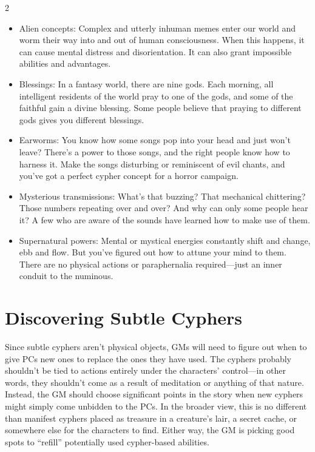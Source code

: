 \begin{multicols}{2}
\begin{itemize}
\item Alien concepts: Complex and utterly inhuman memes enter our world and worm their way into and out of human consciousness. When this happens, it can cause mental distress and disorientation. It can also grant impossible abilities and advantages.

\item Blessings: In a fantasy world, there are nine gods. Each morning, all intelligent residents of the world pray to one of the gods, and some of the faithful gain a divine blessing. Some people believe that praying to different gods gives you different blessings.

\item Earworms: You know how some songs pop into your head and just won’t leave? There’s a power to those songs, and the right people know how to harness it. Make the songs disturbing or reminiscent of evil chants, and you’ve got a perfect cypher concept for a horror campaign.

\item Mysterious transmissions: What’s that buzzing? That mechanical chittering? Those numbers repeating over and over? And why can only some people hear it? A few who are aware of the sounds have learned how to make use of them.

\item Supernatural powers: Mental or mystical energies constantly shift and change, ebb and flow. But you’ve figured out how to attune your mind to them. There are no physical actions or paraphernalia required—just an inner conduit to the numinous.
\end{itemize}

\section{Discovering Subtle Cyphers}

Since subtle cyphers aren’t physical objects, GMs will need to figure out when to give PCs new ones to replace the ones they have used. The cyphers probably shouldn’t be tied to actions entirely under the characters’ control—in other words, they shouldn’t come as a result of meditation or anything of that nature. Instead, the GM should choose significant points in the story when new cyphers might simply come unbidden to the PCs. In the broader view, this is no different than manifest cyphers placed as treasure in a creature’s lair, a secret cache, or somewhere else for the characters to find. Either way, the GM is picking good spots to “refill” potentially used cypher-based abilities.


\end{multicols}
